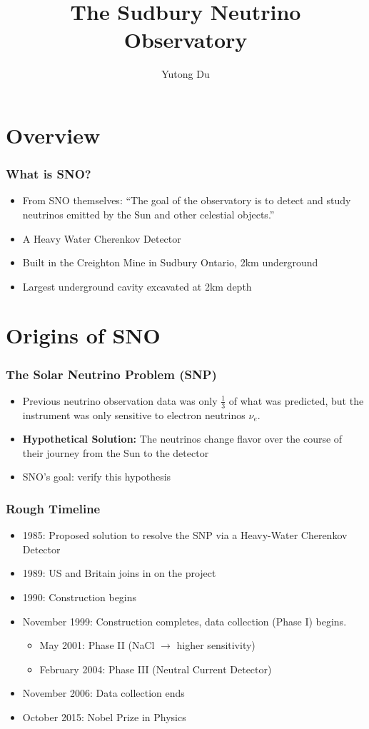 \documentclass[10pt]{beamer}
\title{The Sudbury Neutrino Observatory}
\author{Yutong Du}
\institute[Berkeley]{Physics H190 Research Presentation}
\begin{document}
    \frame{\titlepage}

	\section{Overview}
    \begin{frame}
        \frametitle{What is SNO?}
		\begin{itemize}
			\item From SNO themselves: ``The goal of the observatory is to detect and study neutrinos emitted
				by the Sun and other celestial objects.'' 	
			\item A Heavy Water Cherenkov Detector
			\item Built in the Creighton Mine in Sudbury Ontario, 2km underground
			\item Largest underground cavity excavated at 2km depth
		\end{itemize}
            \end{frame}
	\section{Origins of SNO}
	\begin{frame}
		\frametitle{The Solar Neutrino Problem (SNP)}
		\begin{itemize}
			\item Previous neutrino observation data was only $\frac{1}{3}$ of what was predicted, but the 
				instrument was only sensitive to electron neutrinos $\nu_e$.
			\item \textbf{Hypothetical Solution:} The neutrinos change flavor over the course of their journey 
				from the Sun to the detector
				\item SNO's goal: verify this hypothesis
		\end{itemize}
	\end{frame}

	\begin{frame}
		\frametitle{Rough Timeline}
		\begin{itemize}
			\item 1985: Proposed solution to resolve the SNP via a Heavy-Water Cherenkov Detector
			\item 1989: US and Britain joins in on the project
			\item 1990: Construction begins
			\item November 1999: Construction completes, data collection (Phase I) begins. 
				\begin{itemize}
					\item May 2001: Phase II (NaCl $\rightarrow$ higher sensitivity)
					\item February 2004: Phase III (Neutral Current Detector)
				\end{itemize}
			\item November 2006: Data collection ends
			\item October 2015: Nobel Prize in Physics
		\end{itemize}
	\end{frame}
\end{document}

